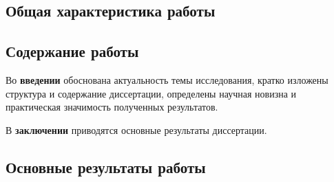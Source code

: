 \subsection*{Общая характеристика работы}


\subsection*{Содержание работы}
Во \textbf{введении} обоснована  актуальность темы исследования, кратко изложены структура и содержание диссертации, определены научная новизна и практическая значимость полученных результатов.



В \textbf{заключении} приводятся основные результаты диссертации.
\subsection*{Основные результаты работы}


\renewcommand{\refname}{\Large Основные публикации по теме диссертации}
\nocite{*}
